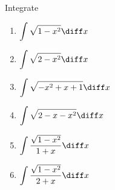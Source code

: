Integrate
\begin{enumerate}[ref={\fcProblemRef}]
\item 
$\displaystyle
\int \sqrt{1-x^2}\diff x$
\item 
$\displaystyle
\int \sqrt{2-x^2}\diff x
$
\item 
$\displaystyle
\int \sqrt{-x^2+x+1}\diff x
$
\item 
$\displaystyle
\int \sqrt{2-x-x^2}\diff x
$

\item \label{problemintsqrt(1-x^2)/(1+x)dx}
$\displaystyle
\int \frac{\sqrt{1-x^2} }{1+x}\diff x
$
\item 
$\displaystyle
\int \frac{\sqrt{1-x^2} }{2+x}\diff x
$
\end{enumerate}
